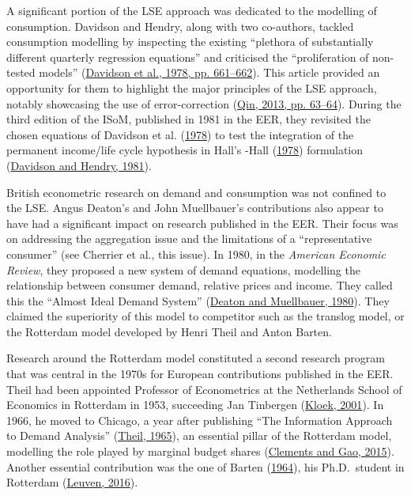 \documentclass[
  12pt,
  onecolumn]{article}
\begin{document}
A significant portion of the LSE approach was dedicated to the modelling
of consumption. Davidson and Hendry, along with two co-authors, tackled
consumption modelling by inspecting the existing ``plethora of
substantially different quarterly regression equations'' and criticised
the ``proliferation of non-tested models''
(\protect\hyperlink{ref-davidson1978}{Davidson et al., 1978, pp.
661--662}). This article provided an opportunity for them to highlight
the major principles of the LSE approach, notably showcasing the use of
error-correction (\protect\hyperlink{ref-qin2013a}{Qin, 2013, pp.
63--64}). During the third edition of the ISoM, published in 1981 in the
EER, they revisited the chosen equations of Davidson et al.
(\protect\hyperlink{ref-davidson1978}{1978}) to test the integration of
the permanent income/life cycle hypothesis in Hall's -Hall
(\protect\hyperlink{ref-hall1978b}{1978}) formulation
(\protect\hyperlink{ref-davidson1981}{Davidson and Hendry, 1981}).

British econometric research on demand and consumption was not confined
to the LSE. Angus Deaton's and John Muellbauer's contributions also
appear to have had a significant impact on research published in the
EER. Their focus was on addressing the aggregation issue and the
limitations of a ``representative consumer'' (see Cherrier et al., this
issue). In 1980, in the \emph{American Economic Review}, they proposed a
new system of demand equations, modelling the relationship between
consumer demand, relative prices and income. They called this the
``Almost Ideal Demand System''
(\protect\hyperlink{ref-deaton1980}{Deaton and Muellbauer, 1980}). They
claimed the superiority of this model to competitor such as the translog
model, or the Rotterdam model developed by Henri Theil and Anton Barten.

Research around the Rotterdam model constituted a second research
program that was central in the 1970s for European contributions
published in the EER. Theil had been appointed Professor of Econometrics
at the Netherlands School of Economics in Rotterdam in 1953, succeeding
Jan Tinbergen (\protect\hyperlink{ref-kloek2001}{Kloek, 2001}). In 1966,
he moved to Chicago, a year after publishing ``The Information Approach
to Demand Analysis'' (\protect\hyperlink{ref-theil1965}{Theil, 1965}),
an essential pillar of the Rotterdam model, modelling the role played by
marginal budget shares (\protect\hyperlink{ref-clements2015a}{Clements
and Gao, 2015}). Another essential contribution was the one of Barten
(\protect\hyperlink{ref-barten1964}{1964}), his Ph.D.~student in
Rotterdam (\protect\hyperlink{ref-kuleuven2016}{Leuven, 2016}).
\end{document}
